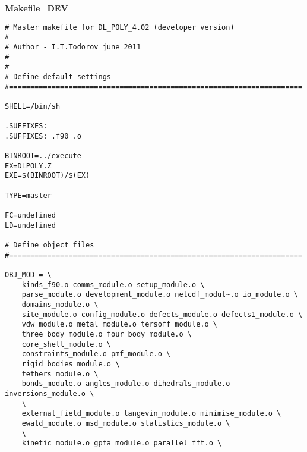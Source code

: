 \label{makefiles}
{\sc \bf \underline{Makefile\_DEV}}
\begin{verbatim}
# Master makefile for DL_POLY_4.02 (developer version)
#
# Author - I.T.Todorov june 2011
#
#
# Define default settings
#=====================================================================

SHELL=/bin/sh

.SUFFIXES:
.SUFFIXES: .f90 .o

BINROOT=../execute
EX=DLPOLY.Z
EXE=$(BINROOT)/$(EX)

TYPE=master

FC=undefined
LD=undefined

# Define object files
#=====================================================================

OBJ_MOD = \
	kinds_f90.o comms_module.o setup_module.o \
	parse_module.o development_module.o netcdf_modul~.o io_module.o \
	domains_module.o \
	site_module.o config_module.o defects_module.o defects1_module.o \
	vdw_module.o metal_module.o tersoff_module.o \
	three_body_module.o four_body_module.o \
	core_shell_module.o \
	constraints_module.o pmf_module.o \
	rigid_bodies_module.o \
	tethers_module.o \
	bonds_module.o angles_module.o dihedrals_module.o inversions_module.o \
	\
	external_field_module.o langevin_module.o minimise_module.o \
	ewald_module.o msd_module.o statistics_module.o \
	\
	kinetic_module.o gpfa_module.o parallel_fft.o \


\end{verbatim}
